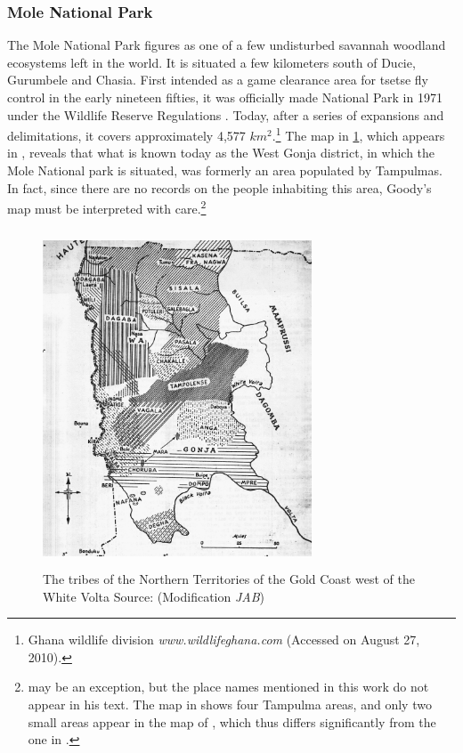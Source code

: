 


\subsubsection{Mole National Park}
\label{sec:SOC-mole}


The Mole National Park  figures  as one of a few undisturbed savannah woodland
ecosystems left in the world.  It  is situated a few kilometers south of Ducie,
Gurumbele and  Chasia. First intended as a game clearance area for tsetse fly
control in the early nineteen  fifties, it was officially made  National Park 
in 1971
under the Wildlife Reserve Regulations \citep[2]{Clif03}. Today, after a series of
expansions and delimitations,  it covers approximately 4,577
$km^{2}$.\footnote{Ghana wildlife division {\it  www.wildlifeghana.com}
(Accessed  on August 27, 2010).} The map in \ref{fig:Goody54-map}, which appears
in \cite{Good54}, reveals that what is known today as the West Gonja district,
in which the Mole National park is situated,  was formerly an area populated by
Tampulmas. In fact,  since there are no records on the people inhabiting this
area, Goody's map must be interpreted with
care.\footnote{\citet[515-524]{Ratt32b} may be an exception, but the place names
mentioned in this work do not appear in his text. The map in
\citet[56-58]{Kohl58} shows four Tampulma areas, and only two small areas appear
in
the map of \cite{Mano51},  which thus differs significantly from the one in
\cite{Good54}.} 


 \begin{figure}
 \centering
 \includegraphics[width=8cm,height=10cm]{Graphic/Maps/Goody54.jpeg}
  \caption[Tribes of the Northern Territories. Source: \cite{Good54}]{The
tribes of the Northern Territories of the Gold Coast west of the White Volta
Source: \citet[2]{Good54} (Modification {\it JAB})
\label{fig:Goody54-map}}
\end{figure}



